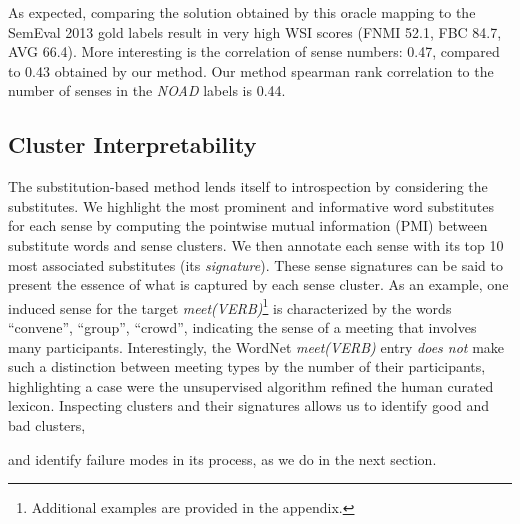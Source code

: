 \documentclass[11pt,a4paper]{article}
\begin{document}
As expected, comparing the solution obtained by this oracle mapping to the
SemEval 2013 gold labels result in very high WSI scores (FNMI 52.1, FBC 84.7,
AVG 66.4). More interesting is the correlation of sense numbers: 0.47, compared to
0.43 obtained by our method. Our method spearman rank correlation to the number of senses in the \emph{NOAD} labels is 0.44.

\subsection{Cluster Interpretability}
The substitution-based method lends itself to introspection by considering the substitutes. We highlight the most prominent and informative word substitutes for each sense by computing the pointwise mutual
information (PMI) between substitute words and sense clusters. We then annotate each
sense with its top 10 most associated substitutes (its \emph{signature}). These sense signatures can be said to present the essence of what is captured by
each sense cluster.
As an example, one induced sense for the target \emph{meet(VERB)}\footnote{Additional examples are provided in the appendix.} %
is characterized by the words ``convene'', ``group'', ``crowd'', indicating the sense of a meeting that involves many participants. Interestingly, the WordNet \emph{meet(VERB)} entry \emph{does not} make such a distinction between meeting types by the number of their participants, highlighting a case were the unsupervised algorithm refined the human curated lexicon.
%
Inspecting clusters and their signatures allows us to identify good and bad clusters,

and identify failure modes in its process, as we do in the next section. 
\end{document}
